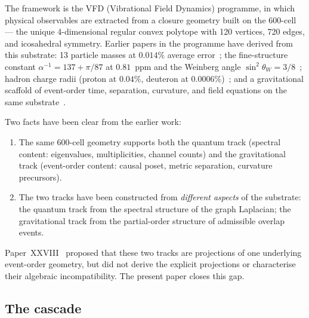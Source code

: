 \documentclass[12pt]{article}
\begin{document}
The framework is the VFD (Vibrational Field Dynamics) programme, in which physical observables are extracted from a closure geometry built on the 600-cell --- the unique 4-dimensional regular convex polytope with 120 vertices, 720 edges, and icosahedral symmetry. Earlier papers in the programme have derived from this substrate: 13 particle masses at $0.014\%$ average error~\citep{SmartV}; the fine-structure constant $\alpha^{-1} = 137 + \pi/87$ at $0.81$~ppm and the Weinberg angle $\sin^2\theta_W = 3/8$~\citep{SmartXXII}; hadron charge radii (proton at $0.04\%$, deuteron at $0.0006\%$)~\citep{SmartXXXII}; and a gravitational scaffold of event-order time, separation, curvature, and field equations on the same substrate~\citep{SmartXXIII,SmartXXIV,SmartXXV,SmartXXVI,SmartXXVII,SmartXXVIII}.

Two facts have been clear from the earlier work:
\begin{enumerate}
    \item The same 600-cell geometry supports both the quantum track (spectral content: eigenvalues, multiplicities, channel counts) and the gravitational track (event-order content: causal poset, metric separation, curvature precursors).
    \item The two tracks have been constructed from \emph{different aspects} of the substrate: the quantum track from the spectral structure of the graph Laplacian; the gravitational track from the partial-order structure of admissible overlap events.
\end{enumerate}

Paper~XXVIII~\citep{SmartXXVIII} proposed that these two tracks are projections of one underlying event-order geometry, but did not derive the explicit projections or characterise their algebraic incompatibility. The present paper closes this gap.

\subsection{The cascade}
\end{document}
